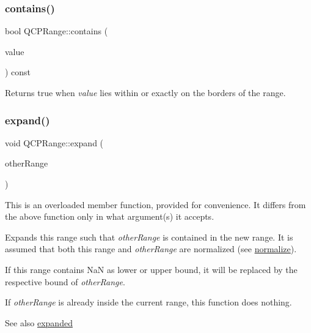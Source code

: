 \subsubsection{\texorpdfstring{contains()}{contains()}}
{\footnotesize\ttfamily bool Q\+C\+P\+Range\+::contains (\begin{DoxyParamCaption}\item[{double}]{value }\end{DoxyParamCaption}) const\hspace{0.3cm}{\ttfamily [inline]}}

Returns true when {\itshape value} lies within or exactly on the borders of the range. \mbox{\label{class_q_c_p_range_a0fa1bc8048be50d52bea93a8caf08305}} 
\subsubsection{\texorpdfstring{expand()}{expand()}\hspace{0.1cm}{\footnotesize\ttfamily [1/2]}}
{\footnotesize\ttfamily void Q\+C\+P\+Range\+::expand (\begin{DoxyParamCaption}\item[{const \hyperlink{class_q_c_p_range}{Q\+C\+P\+Range} \&}]{other\+Range }\end{DoxyParamCaption})}

This is an overloaded member function, provided for convenience. It differs from the above function only in what argument(s) it accepts.

Expands this range such that {\itshape other\+Range} is contained in the new range. It is assumed that both this range and {\itshape other\+Range} are normalized (see \hyperlink{class_q_c_p_range_af914a7740269b0604d0827c634a878a9}{normalize}).

If this range contains NaN as lower or upper bound, it will be replaced by the respective bound of {\itshape other\+Range}.

If {\itshape other\+Range} is already inside the current range, this function does nothing.

\begin{DoxySeeAlso}{See also}
\hyperlink{class_q_c_p_range_a9cbfb7cd06eac1839cae981e05c19633}{expanded} 
\end{DoxySeeAlso}
\mbox{\label{class_q_c_p_range_a5fa977db0a4b7800075c629c62cf5e80}} 
